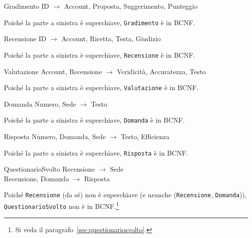 \begin{samepage}
\begin{funcdep}{Gradimento}
    ID $\to$ Account, Proposta, Suggerimento, Punteggio
\end{funcdep}
Poiché la parte a sinistra è superchiave, {\tt Gradimento} è in BCNF.
\end{samepage}

\begin{samepage}
\begin{funcdep}{Recensione}
    ID $\to$ Account, Ricetta, Testa, Giudizio
\end{funcdep}
Poiché la parte a sinistra è superchiave, {\tt Recensione} è in BCNF.
\end{samepage}

\begin{samepage}
\begin{funcdep}{Valutazione}
    Account, Recensione $\to$ Veridicità, Accuratezza, Testo
\end{funcdep}
Poiché la parte a sinistra è superchiave, {\tt Valutazione} è in BCNF.
\end{samepage}

\begin{samepage}
\begin{funcdep}{Domanda}
    Numero, Sede $\to$ Testo
\end{funcdep}
Poiché la parte a sinistra è superchiave, {\tt Domanda} è in BCNF.
\end{samepage}

\begin{samepage}
\begin{funcdep}{Risposta}
    Numero, Domanda, Sede $\to$ Testo, Efficienza
\end{funcdep}
Poiché la parte a sinistra è superchiave, {\tt Risposta} è in BCNF.
\end{samepage}

\begin{samepage}
\begin{funcdep}{QuestionarioSvolto}
    Recensione $\to$ Sede\\
    Recensione, Domanda $\to$ Risposta
\end{funcdep}
Poiché {\tt Recensione} (da sé) non è superchiave (e neanche ({\tt Recensione}, {\tt Domanda})), {\tt QuestionarioSvolto} non è in BCNF.\footnote{Si veda il paragrafo~\vref{sec:questionariosvolto}.}
\end{samepage}
